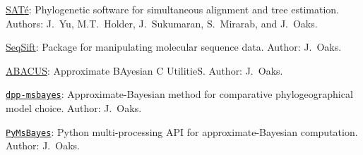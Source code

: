 \myHangIndent
\href{http://phylo.bio.ku.edu/software/sate/sate.html}{{SAT}\'{e}}:
    Phylogenetic software for simultaneous alignment and tree estimation.
Authors: J.\ Yu, M.T.\ Holder, J.\ Sukumaran, S.\ Mirarab, and J.\ Oaks.

\myHangIndent
\href{https://github.com/joaks1/SeqSift}{SeqSift}:
    Package for manipulating molecular sequence data.
Author: J.\ Oaks.

\myHangIndent
\href{https://github.com/joaks1/abacus}{ABACUS}:
    Approximate BAyesian C UtilitieS.
Author: J.\ Oaks.

\myHangIndent
\href{https://github.com/joaks1/dpp-msbayes}{\texttt{dpp-msbayes}}:
    Approximate-Bayesian method for comparative phylogeographical model choice.
Author: J.\ Oaks.

\myHangIndent
\href{https://github.com/joaks1/PyMsBayes}{\texttt{PyMsBayes}}:
    Python multi-processing API for approximate-Bayesian computation.
Author: J.\ Oaks.

